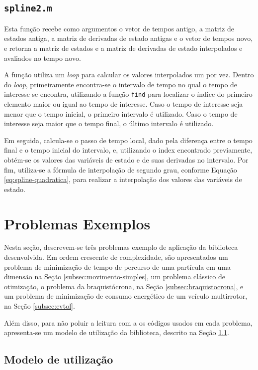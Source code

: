 \subsection{\texttt{spline2.m}}
\label{subsec:spline2}

Esta função recebe como argumentos o vetor de tempos antigo, a matriz de estados antiga, a matriz de derivadas de estado antigas e o vetor de tempos novo, e retorna a matriz de estados e a matriz de derivadas de estado interpolados e avaliados no tempo novo.

A função utiliza um \textit{loop} para calcular os valores interpolados um por vez. Dentro do \textit{loop}, primeiramente encontra-se o intervalo de tempo no qual o tempo de interesse se encontra, utilizando a função \texttt{find} para localizar o índice do primeiro elemento maior ou igual ao tempo de interesse. Caso o tempo de interesse seja menor que o tempo inicial, o primeiro intervalo é utilizado. Caso o tempo de interesse seja maior que o tempo final, o último intervalo é utilizado.

Em seguida, calcula-se o passo de tempo local, dado pela diferença entre o tempo final e o tempo inicial do intervalo, e, utilizando o index encontrado previamente, obtém-se os valores das variáveis de estado e de suas derivadas no intervalo. Por fim, utiliza-se a fórmula de interpolação de segundo grau, conforme Equação \ref{eq:spline-quadratica}, para realizar a interpolação dos valores das variáveis de estado.

\section{Problemas Exemplos}
\label{sec:problemas-exemplos}

Nesta seção, descrevem-se três problemas exemplo de aplicação da biblioteca desenvolvida. Em ordem crescente de complexidade, são apresentados um problema de minimização de tempo de percurso de uma partícula em uma dimensão na Seção \ref{subsec:movimento-simples}, um problema clássico de otimização, o problema da braquistócrona, na Seção \ref{subsec:braquistocrona}, e um problema de minimização de consumo energético de um veículo multirrotor, na Seção \ref{subsec:evtol}.

Além disso, para não poluir a leitura com a os códigos usados em cada problema, apresenta-se um modelo de utilização da biblioteca, descrito na Seção \ref{subsec:modelo-utilizacao}.

\subsection{Modelo de utilização}
\label{subsec:modelo-utilizacao}

